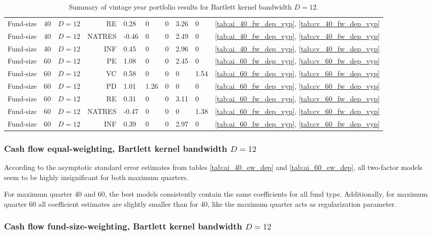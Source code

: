 \documentclass[12pt]{article}
\begin{document}
\begin{table}[ht]
\begin{tabular}{lllrlllllr}
		Fund-size & 40 & $D=12$ & RE & 0.28 & 0 & 0 & 3.26 & 0 & \ref{tab:ai_40_fw_dep_vyp}, \ref{tab:cv_40_fw_dep_vyp} \\ 
		Fund-size & 40 & $D=12$ & NATRES & -0.46 & 0 & 0 & 2.49 & 0 & \ref{tab:ai_40_fw_dep_vyp}, \ref{tab:cv_40_fw_dep_vyp} \\ 
		Fund-size & 40 & $D=12$ & INF & 0.45 & 0 & 0 & 2.96 & 0 & \ref{tab:ai_40_fw_dep_vyp}, \ref{tab:cv_40_fw_dep_vyp} \\ 
		\hline
		Fund-size & 60 & $D=12$ & PE & 1.08 & 0 & 0 & 2.45 & 0 & \ref{tab:ai_60_fw_dep_vyp}, \ref{tab:cv_60_fw_dep_vyp} \\ 
		Fund-size & 60 & $D=12$ & VC & 0.58 & 0 & 0 & 0 & 1.54 & \ref{tab:ai_60_fw_dep_vyp}, \ref{tab:cv_60_fw_dep_vyp} \\ 
		Fund-size & 60 & $D=12$ & PD & 1.01 & 1.26 & 0 & 0 & 0 & \ref{tab:ai_60_fw_dep_vyp}, \ref{tab:cv_60_fw_dep_vyp} \\ 
		Fund-size & 60 & $D=12$ & RE & 0.31 & 0 & 0 & 3.11 & 0 & \ref{tab:ai_60_fw_dep_vyp}, \ref{tab:cv_60_fw_dep_vyp} \\ 
		Fund-size & 60 & $D=12$ & NATRES & -0.47 & 0 & 0 & 0 & 1.38 & \ref{tab:ai_60_fw_dep_vyp}, \ref{tab:cv_60_fw_dep_vyp} \\ 
		Fund-size & 60 & $D=12$ & INF & 0.39 & 0 & 0 & 2.97 & 0 & \ref{tab:ai_60_fw_dep_vyp}, \ref{tab:cv_60_fw_dep_vyp} \\ 
		\hline
		\hline
	\end{tabular}
	\caption{Summary of vintage year portfolio results for Bartlett kernel bandwidth $D=12$.}
	\label{tab:result_summary_vyp}
\end{table}


\subsubsection*{Cash flow equal-weighting, Bartlett kernel bandwidth $D=12$}

According to the asymptotic standard error estimates from tables \ref{tab:ai_40_ew_dep} and \ref{tab:ai_60_ew_dep}, all two-factor models seem  to be highly insignificant for both maximum quarters.

For maximum quarter 40 and 60, the best models consistently contain the same coefficients for all fund type.
Additionally, for maximum quarter 60 all coefficient estimates are slightly smaller than for 40, like the maximum quarter acts as regularization parameter.


\subsubsection*{Cash flow fund-size-weighting, Bartlett kernel bandwidth $D=12$}
\end{document}
